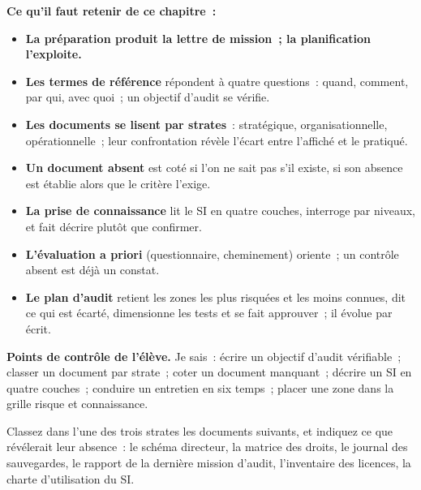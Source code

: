 \begin{boxresume}
\textbf{Ce qu'il faut retenir de ce chapitre~:}
\begin{itemize}
    \item \textbf{La préparation produit la lettre de mission~; la
          planification l'exploite.}
    \item \textbf{Les termes de référence} répondent à quatre questions~:
          quand, comment, par qui, avec quoi~; un objectif d'audit se
          vérifie.
    \item \textbf{Les documents se lisent par strates}~: stratégique,
          organisationnelle, opérationnelle~; leur confrontation révèle
          l'écart entre l'affiché et le pratiqué.
    \item \textbf{Un document absent} est coté \NEK{} si l'on ne sait pas
          s'il existe, \NON{} si son absence est établie alors que le
          critère l'exige.
    \item \textbf{La prise de connaissance} lit le SI en quatre couches,
          interroge par niveaux, et fait décrire plutôt que confirmer.
    \item \textbf{L'évaluation a priori} (questionnaire, cheminement)
          oriente~; un contrôle absent est déjà un constat.
    \item \textbf{Le plan d'audit} retient les zones les plus risquées et les
          moins connues, dit ce qui est écarté, dimensionne les tests et se
          fait approuver~; il évolue par écrit.
\end{itemize}
\end{boxresume}

\begin{boxinfo}
\textbf{Points de contrôle de l'élève.} Je sais~: écrire un objectif
d'audit vérifiable~; classer un document par strate~; coter un document
manquant~; décrire un SI en quatre couches~; conduire un entretien en six
temps~; placer une zone dans la grille risque et connaissance.
\end{boxinfo}

\bigskip

\begin{boxexo}[title={\ding{45}\quad Exercice~8.1. Classer les documents \niveaubase}]
Classez dans l'une des trois strates les documents suivants, et indiquez ce
que révélerait leur absence~: le schéma directeur, la matrice des droits, le
journal des sauvegardes, le rapport de la dernière mission d'audit,
l'inventaire des licences, la charte d'utilisation du SI.
\end{boxexo}

